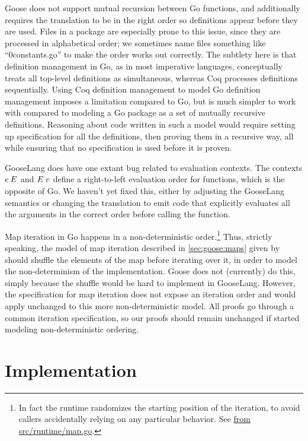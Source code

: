 Goose does not support mutual recursion between Go functions, and
additionally requires the translation to be in the right order so
definitions appear before they are used. Files in a package are especially prone
to this issue, since they are processed in alphabetical order; we sometimes name
files something like ``0constants.go'' to make the order works out correctly.
The subtlety here is that
definition management in Go, as in most imperative languages,
conceptually treats all top-level definitions as simultaneous, whereas
Coq processes definitions sequentially. Using Coq definition management
to model Go definition management imposes a limitation compared to Go,
but is much simpler to work with compared to modeling a Go package as a
set of mutually recursive definitions. Reasoning about code written in such a
model would require setting up specification for all the definitions, then
proving them in a recursive way, all while ensuring that no specification is
used before it is proven.

GooseLang does have one extant bug related to evaluation contexts. The contexts
$e \: E$ and $E \: v$ define a right-to-left evaluation order for functions,
which is the opposite of Go. We haven't yet fixed this, either by adjusting the
GooseLang semantics or changing the translation to emit code that explicitly
evaluates all the arguments in the correct order before calling the function.

Map iteration in Go happens in a non-deterministic order.\footnote{In fact the
runtime randomizes the starting position of the iteration, to avoid callers
accidentally relying on any particular behavior. See
\href{https://github.com/golang/go/blob/c379c3d58d5482f4c8fe97466a99ce70e630ad44/src/runtime/map.go\#L844-L850}%
{ from src/runtime/map.go}.} Thus, strictly speaking, the model
of map iteration described in \cref{sec:goose:maps} given by  should
shuffle the elements of the map before iterating over it, in order to model the
non-determinism of the implementation. Goose does not (currently) do this,
simply because the shuffle would be hard to implement in GooseLang. However, the
specification for map iteration does not expose an iteration order and would
apply unchanged to this more non-deterministic model. All proofs go through a
common iteration specification, so our proofs should remain unchanged if
 started modeling non-deterministic ordering.

\section{Implementation}%
\label{sec:goose:impl}

